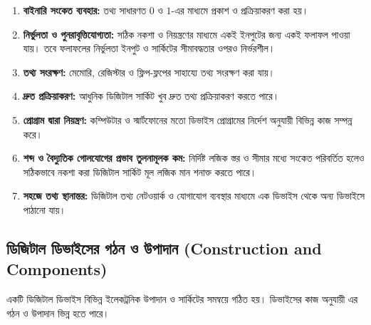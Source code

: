 \begin{enumerate}
    \item \textbf{বাইনারি সংকেত ব্যবহার:} তথ্য সাধারণত \(0\) ও \(1\)-এর মাধ্যমে প্রকাশ ও প্রক্রিয়াকরণ করা হয়।
    
    \item \textbf{নির্ভুলতা ও পুনরাবৃত্তিযোগ্যতা:} সঠিক নকশা ও নিয়ন্ত্রণের মাধ্যমে একই ইনপুটের জন্য একই ফলাফল পাওয়া যায়। তবে ফলাফলের নির্ভুলতা ইনপুট ও সার্কিটের সীমাবদ্ধতার ওপরও নির্ভরশীল।
    
    \item \textbf{তথ্য সংরক্ষণ:} মেমোরি, রেজিস্টার ও ফ্লিপ-ফ্লপের সাহায্যে তথ্য সংরক্ষণ করা যায়।
    
    \item \textbf{দ্রুত প্রক্রিয়াকরণ:} আধুনিক ডিজিটাল সার্কিট খুব দ্রুত তথ্য প্রক্রিয়াকরণ করতে পারে।
    
    \item \textbf{প্রোগ্রাম দ্বারা নিয়ন্ত্রণ:} কম্পিউটার ও স্মার্টফোনের মতো ডিভাইস প্রোগ্রামের নির্দেশ অনুযায়ী বিভিন্ন কাজ সম্পন্ন করে।
    
    \item \textbf{শব্দ ও বৈদ্যুতিক গোলযোগের প্রভাব তুলনামূলক কম:} নির্দিষ্ট লজিক স্তর ও সীমার মধ্যে সংকেত পরিবর্তিত হলেও সঠিকভাবে নকশা করা ডিজিটাল সার্কিট মূল লজিক মান শনাক্ত করতে পারে।
    
    \item \textbf{সহজে তথ্য স্থানান্তর:} ডিজিটাল তথ্য নেটওয়ার্ক ও যোগাযোগ ব্যবস্থার মাধ্যমে এক ডিভাইস থেকে অন্য ডিভাইসে পাঠানো যায়।
\end{enumerate}

\subsection{ডিজিটাল ডিভাইসের গঠন ও উপাদান
(\textenglish{Construction and Components})}

একটি ডিজিটাল ডিভাইস বিভিন্ন ইলেকট্রনিক উপাদান ও সার্কিটের সমন্বয়ে গঠিত হয়। ডিভাইসের কাজ অনুযায়ী এর গঠন ও উপাদান ভিন্ন হতে পারে।

